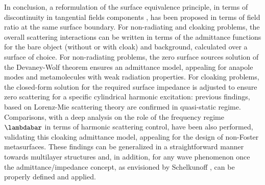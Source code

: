 \documentclass[reprint, showpacs, amsmath,amssymb, aps,
prb]{revtex4-1}
\begin{document}
In conclusion, a reformulation of the surface equivalence principle, in terms of discontinuity in tangential fields components \cite{Schelkunoff_1}, has been proposed in terms of field ratio at the same surface boundary. For non-radiating and cloaking problems,  the overall scattering interactions can be written in terms of the admittance functions for the bare object (without or with cloak) and background, calculated over a surface of choice. For non-radiating problems, the zero surface sources solution of the Devaney-Wolf theorem ensures an admittance model, appealing for anapole modes and metamolecules with weak radiation properties\cite{ana1,ana2}. For cloaking problems, the closed-form solution for the required surface impedance is adjusted to ensure zero scattering for a specific cylindrical harmonic excitation: previous findings, based on Lorenz-Mie scattering theory are confirmed in quasi-static regime. Comparisons, with a deep analysis on the role of the frequency regime $\lambdabar$ in terms of harmonic scattering control, have been also performed, validating this cloaking admittance model, appealing for the design of non-Foster metasurfaces. These findings can be generalized  in a straightforward manner towards multilayer structures and, in addition, for any wave phenomenon once the admittance/impedance concept, as envisioned by Schelkunoff \cite{Imp_Gen}, can be properly defined and applied. 
%
%
%
%
\end{document}
